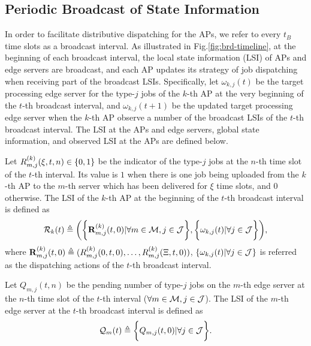 \subsection{Periodic Broadcast of State Information}
\label{subsec:broadcast}
In order to facilitate distributive dispatching for the APs, we refer to every $t_B$ time slots as a broadcast interval.
As illustrated in Fig.\ref{fig:brd-timeline}, at the beginning of each broadcast interval, the local state information (LSI) of APs and edge servers are broadcast, and each AP updates its strategy of job dispatching when receiving part of the broadcast LSIs.
Specifically, let $\omega_{k,j}(t)$ be the target processing edge server for the type-$j$ jobs of the $k$-th AP at the very beginning of the $t$-th broadcast interval, and $\omega_{k,j}(t+1)$ be the updated target processing edge server when the $k$-th AP observe a number of the broadcast LSIs of the $t$-th broadcast interval.
The LSI at the APs and edge servers, global state information, and observed LSI at the APs are defined below.

\begin{definition}
    Let $R^{(k)}_{m,j}(\xi,t,n) \in \{0,1\}$ be the indicator of the type-$j$ jobs at the $n$-th time slot of the $t$-th interval.
    Its value is $1$ when there is one job being uploaded from the $k$-th AP to the $m$-th server which has been delivered for $\xi$ time slots, and $0$ otherwise. 
    The LSI of the $k$-th AP at the beginning of the $t$-th broadcast interval is defined as
    {\small
    \begin{align}
        \mathcal{R}_{k}(t) \triangleq
        \bigg(
            \bigg\{\mathbf{R}^{(k)}_{m,j}(t,0) | \forall m\in\mathcal{M},j\in\mathcal{J}\bigg\},
            \bigg\{\omega_{k,j}(t) | \forall j\in\mathcal{J}\bigg\}
        \bigg),
    \end{align}
    }
    where
    $\mathbf{R}^{(k)}_{m,j}(t,0) \triangleq ( R^{(k)}_{m,j}(0,t,0), \dots, R^{(k)}_{m,j}(\Xi,t,0) )$, $\{\omega_{k,j}(t)|\forall j\in\mathcal{J}\}$ is referred as the dispatching actions of the $t$-th broadcast interval.
\end{definition}

\begin{definition}
    Let $Q_{m,j}({t,n})$ be the pending number of type-$j$ jobs on the $m$-th edge server at the $n$-th time slot of the $t$-th interval ($\forall m\in\mathcal{M}, j\in\mathcal{J}$).
    The LSI of the $m$-th edge server at the $t$-th broadcast interval is defined as
    \begin{align}
        \mathcal{Q}_{m}(t) \triangleq \bigg\{
            Q_{m,j}(t, 0) | \forall j\in\mathcal{J}
        \bigg\}.
    \end{align}
\end{definition}

